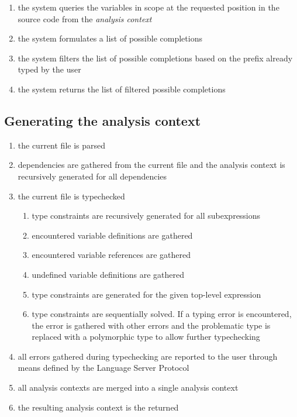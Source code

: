 \documentclass[12pt]{article}
\newcounter{req}
\begin{document}
\begin{enumerate}
  \item the system queries the variables in scope at the requested position in the source code from the \emph{analysis context}
  \item the system formulates a list of possible completions
  \item the system filters the list of possible completions based on the prefix already typed by the user
  \item the system returns the list of filtered possible completions
\end{enumerate}

\subsection{Generating the analysis context}

\begin{enumerate}
  \item the current file is parsed
  \item dependencies are gathered from the current file and the analysis context is recursively generated for all dependencies
  \item the current file is typechecked
        \begin{enumerate}
          \item type constraints are recursively generated for all subexpressions
          \item encountered variable definitions are gathered
          \item encountered variable references are gathered
          \item undefined variable definitions are gathered
          \item type constraints are generated for the given top-level expression
          \item type constraints are sequentially solved. If a typing error is encountered, the error is gathered with other errors and the problematic type is replaced with a polymorphic type to allow further typechecking
        \end{enumerate}
  \item all errors gathered during typechecking are reported to the user through means defined by the Language Server Protocol
  \item all analysis contexts are merged into a single analysis context
  \item the resulting analysis context is the returned
\end{enumerate}
\end{document}
